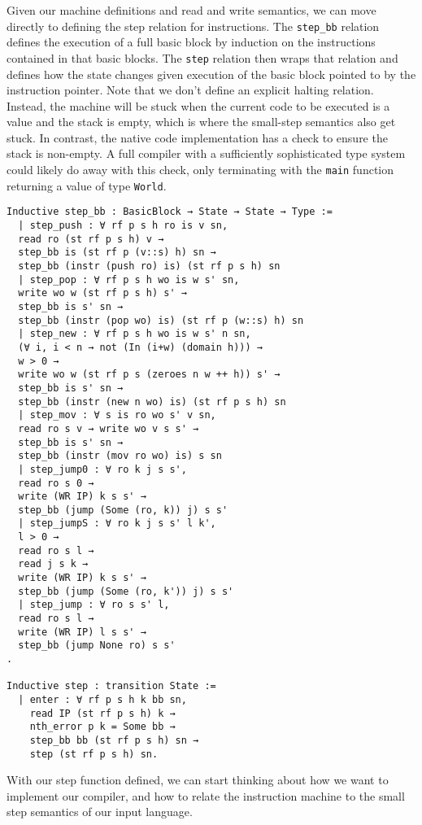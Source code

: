 Given our machine definitions and read and write semantics, we can move directly
to defining the step relation for instructions. The \texttt{step\_bb} relation
defines the execution of a full basic block by induction on the instructions
contained in that basic blocks. The \texttt{step} relation then wraps that
relation and defines how the state changes given execution of the basic block
pointed to by the instruction pointer. Note that we don't define an explicit
halting relation. Instead, the machine will be stuck when the current code to be
executed is a value and the stack is empty, which is where the small-step
\ce semantics also get stuck. In contrast, the native code implementation has a
check to ensure the stack is non-empty. A full compiler with a sufficiently
sophisticated type system could likely do away with this check, only terminating
with the \texttt{main} function returning a value of type \texttt{World}. 

\begin{verbatim}
Inductive step_bb : BasicBlock → State → State → Type := 
  | step_push : ∀ rf p s h ro is v sn,
  read ro (st rf p s h) v → 
  step_bb is (st rf p (v::s) h) sn → 
  step_bb (instr (push ro) is) (st rf p s h) sn
  | step_pop : ∀ rf p s h wo is w s' sn,
  write wo w (st rf p s h) s' → 
  step_bb is s' sn →
  step_bb (instr (pop wo) is) (st rf p (w::s) h) sn
  | step_new : ∀ rf p s h wo is w s' n sn,
  (∀ i, i < n → not (In (i+w) (domain h))) →
  w > 0 →
  write wo w (st rf p s (zeroes n w ++ h)) s' →
  step_bb is s' sn → 
  step_bb (instr (new n wo) is) (st rf p s h) sn 
  | step_mov : ∀ s is ro wo s' v sn, 
  read ro s v → write wo v s s' → 
  step_bb is s' sn → 
  step_bb (instr (mov ro wo) is) s sn
  | step_jump0 : ∀ ro k j s s', 
  read ro s 0 →
  write (WR IP) k s s' → 
  step_bb (jump (Some (ro, k)) j) s s'
  | step_jumpS : ∀ ro k j s s' l k', 
  l > 0 →
  read ro s l →
  read j s k → 
  write (WR IP) k s s' → 
  step_bb (jump (Some (ro, k')) j) s s'
  | step_jump : ∀ ro s s' l, 
  read ro s l →
  write (WR IP) l s s' → 
  step_bb (jump None ro) s s'
.

Inductive step : transition State :=
  | enter : ∀ rf p s h k bb sn,
    read IP (st rf p s h) k → 
    nth_error p k = Some bb → 
    step_bb bb (st rf p s h) sn →
    step (st rf p s h) sn.
\end{verbatim}

With our step function defined, we can start thinking about how we want to
implement our compiler, and how to relate the instruction machine to the small
step semantics of our input language.  

